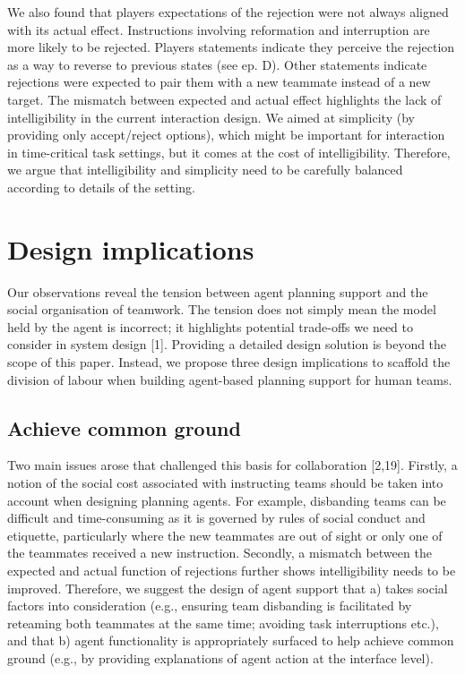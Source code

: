 We also found that players expectations of the rejection were not always aligned with its actual effect. Instructions involving reformation and interruption are more likely to be rejected. Players statements indicate they perceive the rejection as a way to reverse to previous states (see ep. D). Other statements indicate rejections were expected to pair them with a new teammate instead of a new target. The mismatch between expected and actual effect highlights the lack of intelligibility in the current interaction design. We aimed at simplicity (by providing only accept/reject options), which might be important for interaction in time-critical task settings, but it comes at the cost of intelligibility. Therefore, we argue that intelligibility and simplicity need to be carefully balanced according to details of the setting.\\


\section{Design implications}

Our observations reveal the tension between agent planning support and the social organisation of teamwork. The tension does not simply mean the model held by the agent is incorrect; it highlights potential trade-offs we need to consider in system design [1]. Providing a detailed design solution is beyond the scope of this paper. Instead, we propose three design implications to scaffold the division of labour when building agent-based planning support for human teams.\\

\subsection{Achieve common ground}  
Two main issues arose that challenged this basis for collaboration [2,19]. Firstly, a notion of the social cost associated with instructing teams should be taken into account when designing planning agents. For example, disbanding teams can be difficult and time-consuming as it is governed by rules of social conduct and etiquette, particularly where the new teammates are out of sight or only one of the teammates received a new instruction. Secondly, a mismatch between the expected and actual function of rejections further shows intelligibility needs to be improved. Therefore, we suggest the design of agent support that a) takes social factors into consideration (e.g., ensuring team disbanding is facilitated by reteaming both teammates at the same time; avoiding task interruptions etc.), and that b) agent functionality is appropriately surfaced to help achieve common ground (e.g., by providing explanations of agent action at the interface level).

